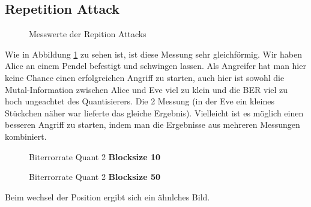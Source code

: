 \documentclass[12pt,a4paper]{article}
\begin{document}
\subsection*{Repetition Attack}
\begin{figure}[H]
\centering

 \qquad
{}  
\caption{Messwerte der Repition Attacks}
\label{fig:9}
\end{figure}
Wie in Abbildung \ref{fig:9} zu sehen ist, ist diese Messung sehr gleichförmig. Wir haben Alice an einem Pendel befestigt und schwingen lassen. Als Angreifer hat man hier keine Chance einen erfolgreichen Angriff zu starten, auch hier ist sowohl die Mutal-Information zwischen Alice und Eve viel zu klein und die BER viel zu hoch ungeachtet des Quantisierers. Die 2 Messung (in der Eve ein kleines Stückchen näher war lieferte das gleiche Ergebnis). Vielleicht ist es möglich einen besseren Angriff zu starten, indem man die Ergebnisse aus mehreren Messungen kombiniert. 
\begin{figure}[H]
\centering
{} \qquad
{}  
\caption{Biterrorrate Quant 2 \textbf{Blocksize 10}}
\label{fig:10}
\end{figure}
\begin{figure}[H]
\centering
{} \qquad
{}  
\caption{Biterrorrate Quant 2 \textbf{Blocksize 50}}
\label{fig:11}
\end{figure}
Beim wechsel der Position ergibt sich ein ähnlches Bild.
\end{document}
